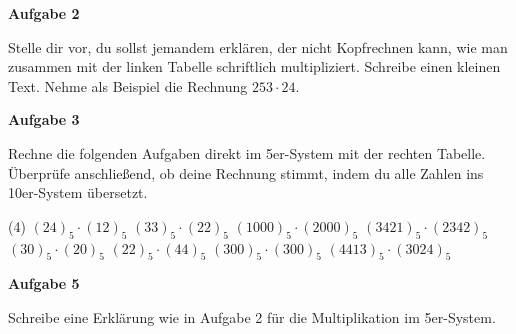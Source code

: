\documentclass[parskip=half-,a4paper]{scrartcl}
\begin{document}
\textbf{Aufgabe 2}\par
Stelle dir vor, du sollst jemandem erklären, der nicht Kopfrechnen kann, wie man zusammen mit der linken Tabelle
schriftlich multipliziert. Schreibe einen kleinen Text. Nehme als Beispiel die Rechnung $253\cdot 24$.

\textbf{Aufgabe 3}\par
Rechne die folgenden Aufgaben direkt im 5er-System mit der rechten Tabelle. Überprüfe anschließend, ob deine Rechnung
stimmt, indem du alle Zahlen ins 10er-System übersetzt.

\begin{tasks}(4)
	\task $(24)_5\cdot(12)_5$
	\task $(33)_5\cdot(22)_5$
	\task $(1000)_5\cdot(2000)_5$
	\task $(3421)_5\cdot(2342)_5$
	\task $(30)_5\cdot(20)_5$
	\task $(22)_5\cdot(44)_5$
	\task $(300)_5\cdot(300)_5$
	\task $(4413)_5\cdot(3024)_5$
\end{tasks}

\textbf{Aufgabe 5}\par
Schreibe eine Erklärung wie in Aufgabe 2 für die Multiplikation im 5er-System.

\end{document}
